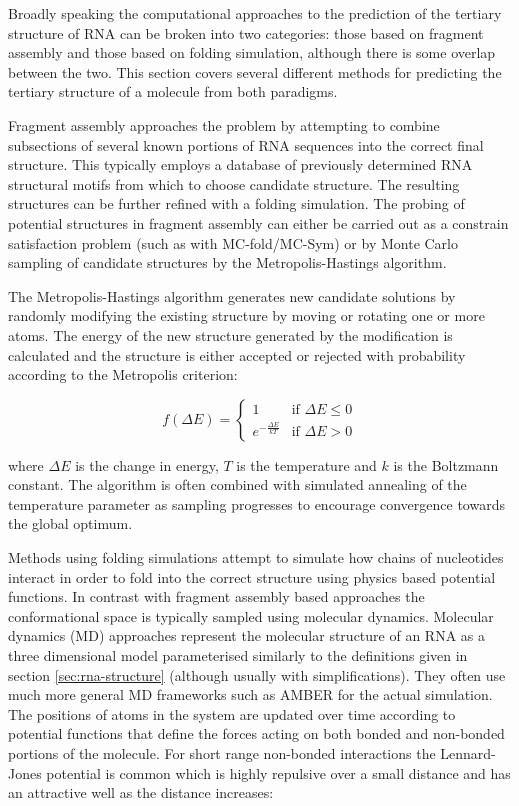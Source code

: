 \documentclass[journal]{IEEEtran}
\begin{document}
Broadly speaking the computational approaches to the prediction of the tertiary structure of RNA can be broken into two categories: those based on fragment assembly and those based on folding simulation, although there is some overlap between the two. This section covers several different methods for predicting the tertiary structure of a molecule from both paradigms.

Fragment assembly approaches the problem by attempting to combine subsections of several known portions of RNA sequences into the correct final structure. This typically employs a database of previously determined RNA structural motifs from which to choose candidate structure. The resulting structures can be further refined with a folding simulation. The probing of potential structures in fragment assembly can either be carried out as a constrain satisfaction problem (such as with MC-fold/MC-Sym\cite{parisien2008mc}) or by Monte Carlo sampling of candidate structures by the Metropolis-Hastings algorithm. 

The Metropolis-Hastings algorithm generates new candidate solutions by randomly modifying the existing structure by moving or rotating one or more atoms. The energy of the new structure generated by the modification is calculated and the structure is either accepted or rejected with probability according to the Metropolis criterion:

\begin{equation}
\label{eq:metropolis-criterion}
f(\Delta E) = 
  \begin{cases} 
    1 & \text{if } \Delta E \leq 0 \\
    e^{-\frac{\Delta E}{kT}} & \text{if } \Delta E > 0
  \end{cases}
\end{equation}

where $\Delta E$ is the change in energy, $T$ is the temperature and $k$ is the Boltzmann constant. The algorithm is often combined with simulated annealing of the temperature parameter as sampling progresses to encourage convergence towards the global optimum. 

Methods using folding simulations attempt to simulate how chains of nucleotides interact in order to fold into the correct structure using physics based potential functions. In contrast with fragment assembly based approaches the conformational space is typically sampled using molecular dynamics. Molecular dynamics (MD) approaches represent the molecular structure of an RNA as a three dimensional model parameterised similarly to the definitions given in section \ref{sec:rna-structure} (although usually with simplifications). They often use much more general MD frameworks such as AMBER \cite{case2010amber} for the actual simulation. The positions of atoms in the system are updated over time according to potential functions that define the forces acting on both bonded and non-bonded portions of the molecule. For short range non-bonded interactions the Lennard-Jones potential is common which is highly repulsive over a small distance and has an attractive well as the distance increases:
\end{document}
